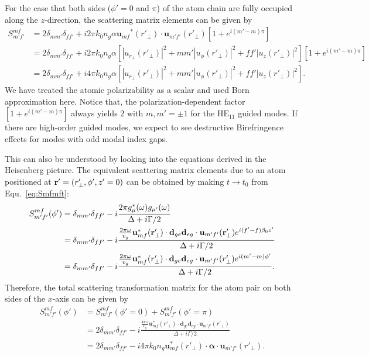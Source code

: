 \documentclass[preprint,aps,pra,onecolumn]{revtex4-1} %
\begin{document}
For the case that both sides ($ \phi'=0 $ and $\pi  $) of the atom chain are fully occupied along the $z$-direction, the scattering matrix elements can be given by
\begin{align}
\!\!\!\!\!\!S^{mf}_{m'f'} &= 2\delta_{mm'}\delta_{ff'} + i2\pi k_0 n_g\alpha  
{\mathbf{u}_{mf}}^*(r'_{\!\perp})\cdot \mathbf{u}_{m'f'}(r'_{\!\perp})[1+e^{i(m'-m)\pi}]\\
&= 2\delta_{mm'}\delta_{ff'} + i2\pi k_0 n_g\alpha  \left[ |u_{r\!_\perp}(r'_{\!\perp})|^2+mm' 
|u_\phi(r'_{\!\perp})|^2+ff'|u_z(r'_\perp)|^2\right][1+e^{i(m'-m)\pi}]\\
&= 2\delta_{mm'}\delta_{ff'} + i4\pi k_0 n_g\alpha  \left[ |u_{r\!_\perp}(r'_{\!\perp})|^2+mm' 
|u_\phi(r'_{\!\perp})|^2+ff'|u_z(r'_\perp)|^2\right].
\end{align}
We have treated the atomic polarizability as a scalar and used Born approximation here. Notice that, the polarization-dependent factor $[1+e^{i(m'-m)\pi}]$ always yields $2$ with $m,m'=\pm 1$ for the $\mathrm{HE}_{11}$ guided modes. If there are high-order guided modes, we expect to see destructive Birefringence effects for modes with odd modal index gaps. 

This can also be understood by looking into the equations derived in the Heisenberg picture. The equivalent scattering matrix elements due to an atom positioned at $\mathbf{r}'=(r'_\perp,\phi',z'=0)$ can be obtained by making $t\rightarrow t_0$ from Equ.~\eqref{eq:Smfmft}:
\begin{align}\label{eq:Smfmfphi_Heisenberg}
S^{mf}_{m'f'}(\phi') &=\delta_{mm'}\delta_{ff'}-i\frac{2\pi 
g_\mu^*(\omega)g_{\mu'}(\omega)}{\Delta+i\Gamma/2}\\
&= \delta_{mm'}\delta_{ff'}-i\frac{ \frac{2\pi 
\omega}{v_g}\mathbf{u}^*_{mf}(\mathbf{r}'_\perp)\cdot\mathbf{d}_{ge} 
\mathbf{d}_{eg}\cdot\mathbf{u}_{m'f'}(\mathbf{r}'_\perp)e^{i(f'-f)\beta_0 z'}}{\Delta+i\Gamma/2}\\
&=  \delta_{mm'}\delta_{ff'}-i\frac{ \frac{2\pi 
\omega}{v_g}\mathbf{u}^*_{mf}(r'_\perp)\cdot\mathbf{d}_{ge} 
\mathbf{d}_{eg}\cdot\mathbf{u}_{m'f'}(r'_\perp)e^{i(m'-m)\phi'}}{\Delta+i\Gamma/2}.
\end{align}
Therefore, the total scattering transformation matrix for the atom pair on both sides of the $x$-axis can be given by
\begin{align}\label{eq:Smfmf2_Heisenberg}
S^{mf}_{m'f'}(\phi') &=S^{mf}_{m'f'}(\phi'=0)+S^{mf}_{m'f'}(\phi'=\pi)\\
&=  2\delta_{mm'}\delta_{ff'}-i\frac{ \frac{4\pi 
\omega}{v_g}\mathbf{u}^*_{mf}(r'_\perp)\cdot\mathbf{d}_{ge} 
\mathbf{d}_{eg}\cdot\mathbf{u}_{m'f'}(r'_\perp)}{\Delta+i\Gamma/2}\\
&= 2\delta_{mm'}\delta_{ff'}-i 4\pi k_0 
n_g\mathbf{u}^*_{mf}(r'_\perp)\cdot\boldsymbol{\alpha}\cdot\mathbf{u}_{m'f'}(r'_\perp) .
\end{align}
\end{document}
